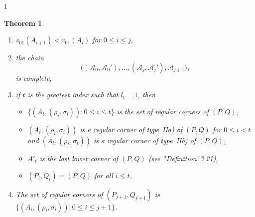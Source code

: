 \documentclass[reqno,a4paper,twoside]{amsart}
\newtheorem{theorem}{Theorem}[section]
\theoremstyle{definition}
\theoremstyle{remark}
\begin{document}
\begin{spacing}{1}
\begin{theorem}
\begin{enumerate}[itemsep=0.5675ex,topsep=0.5675ex]
\item $v_{01}(A_{i+1})<v_{01}(A_i)$ for $0\le i\le j$,

\item the chain
\begin{equation}\label{cadena completa}
\bigl((\mathcal{A}_0,\mathcal{A}_0'),\dots, (\mathcal{A}_j,\mathcal{A}_j'),\mathcal{A}_{j+1}\bigr),
\end{equation}
is complete,

\item if $t$ is the greatest index such that $l_t = 1$, then
%
\begin{itemize}[itemsep=0.565ex,topsep=0.565ex]
%
\item[-] $\bigl\{(A_i,(\rho_i,\sigma_i)): 0\le i\le t\bigr\}$ is the set of regular corners of $(P,Q)$,
%
\item[-] $(A_i,(\rho_i,\sigma_i))$ is a regular corner of type~IIa) of $(P,Q)$ for $0\le i<t$ and $(A_t,(\rho_t,\sigma_t))$ is a regular corner of type~IIb) of $(P,Q)$,
%
\item[-] $A'_t$ is the last lower corner of $(P,Q)$ (see \cite{GGV2}*{Definition~3.21}),
%
\item[-] $(P_i,Q_i) = (P,Q)$ for all $i\le t$,
\end{itemize}

\item The set of regular corners of $(P_{j+1},Q_{j+1})$ is $\{(A_i,(\rho_i,\sigma_i)):0\le i\le j+1\}$.

\end{enumerate}

\end{theorem}


\end{spacing}
\end{document}
